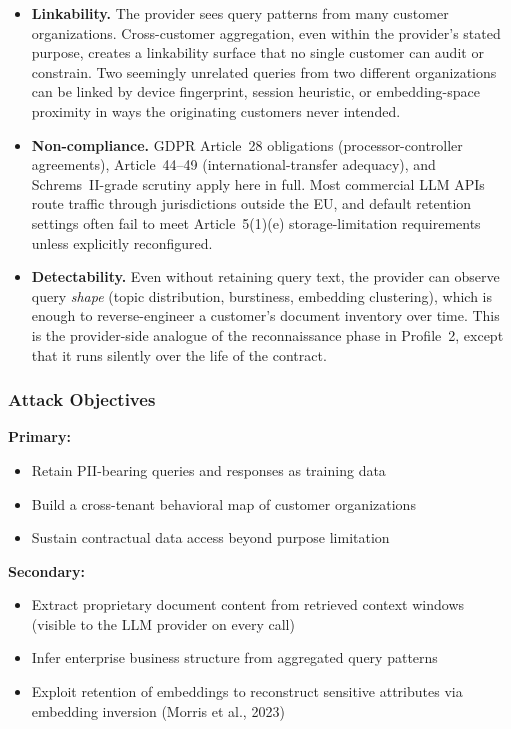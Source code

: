 \documentclass[12pt,a4paper]{report}
\begin{document}
\begin{prosebox}
\begin{itemize}[leftmargin=1.4em, itemsep=5pt]
  \item \textbf{Linkability.} The provider sees query patterns from many
        customer organizations. Cross-customer aggregation, even within
        the provider's stated purpose, creates a linkability surface that
        no single customer can audit or constrain. Two seemingly unrelated
        queries from two different organizations can be linked by device
        fingerprint, session heuristic, or embedding-space proximity in
        ways the originating customers never intended.
  \item \textbf{Non-compliance.} GDPR Article~28 obligations
        (processor-controller agreements), Article~44--49
        (international-transfer adequacy), and Schrems~II-grade scrutiny
        apply here in full. Most commercial LLM APIs route traffic through
        jurisdictions outside the EU, and default retention settings often
        fail to meet Article~5(1)(e) storage-limitation requirements
        unless explicitly reconfigured.
  \item \textbf{Detectability.} Even without retaining query text, the
        provider can observe query \emph{shape} (topic distribution,
        burstiness, embedding clustering), which is enough to reverse-engineer
        a customer's document inventory over time. This is the
        provider-side analogue of the reconnaissance phase in Profile~2,
        except that it runs silently over the life of the contract.
\end{itemize}
\end{prosebox}

\subsubsection{Attack Objectives}

\begin{prosebox}
\textbf{Primary:}
\begin{itemize}[leftmargin=1.4em, itemsep=2pt]
  \item Retain PII-bearing queries and responses as training data
  \item Build a cross-tenant behavioral map of customer organizations
  \item Sustain contractual data access beyond purpose limitation
\end{itemize}
\textbf{Secondary:}
\begin{itemize}[leftmargin=1.4em, itemsep=2pt]
  \item Extract proprietary document content from retrieved context windows
        (visible to the LLM provider on every call)
  \item Infer enterprise business structure from aggregated query patterns
  \item Exploit retention of embeddings to reconstruct sensitive attributes
        via embedding inversion (Morris et al., 2023)
\end{itemize}
\end{prosebox}
\end{document}
